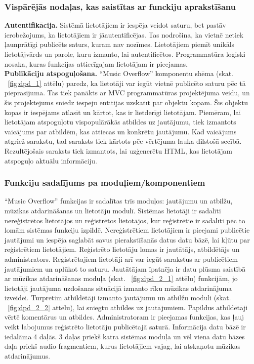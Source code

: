 \documentclass[12pt]{article}
\begin{document}
\subsubsection{Vispārējās nodaļas, kas saistītas ar funckiju aprakstīšanu}

\textbf{Autentifikācija.} Sistēmā lietotājiem ir iespēja veidot saturu, bet pastāv ierobežojums, ka lietotājiem ir jāautentificējas. Tas nodrošina, ka vietnē netiek ļaunprātīgi publicēts saturs, kuram nav nozīmes. Lietotājiem piemīt unikāls lietotājvārds un parole, kuru izmanto, lai autentificētos. Programmatūra loģiski nosaka, kuras funkcijas attiecīgajam lietotājam ir pieejamas.\\
\indent \textbf{Publikāciju atspoguļošana.} ``Music Overflow'' komponentu shēma (skat. ~\ref{fig:dpd_1} attēlu) paredz, ka lietotāji var iegūt vietnē publicēto saturu pēc tā pieprasījuma. Tas tiek panākts ar MVC programmatūras projektējuma veidu, un šis projektējums sniedz iespēju entītijas uzskatīt par objektu kopām. Šīs objektu kopas ir iespējams atlasīt un kārtot, kas ir lietderīgi lietotājam. Piemēram, lai lietotājam atspoguļotu vispopulārākās atbildes uz jautājumu, tiek izmantots vaicājums par atbildēm, kas attiecas un konkrētu jautājumu. Kad vaicājums atgriež sarakstu, tad saraksts tiek kārtots pēc vērtējuma lauka dilstošā secībā. Rezultējošais saraksts tiek izmantots, lai uzģenerētu HTML, kas lietotājam atspoguļo aktuālu informāciju. 

\subsubsection{Funkciju sadalījums pa moduļiem/komponentiem}

``Music Overflow'' funkcijas ir sadalītas trīs moduļos: jautājumu un atbilžu, mūzikas atdarināšanas un lietotāju modulī. Sistēmas lietotāji ir sadalīti nereģistrētos lietotājos un reģistrētos lietotājos, kur reģistrētie ir sadalīti pēc to lomām sistēmas funkciju izpildē. Nereģistrētiem lietotājiem ir pieejami publicētie jautājumi un iespēja saglabāt savus pierakstīšanās datus datu bāzē, lai kļūtu par reģistrētiem lietotājiem. Reģistrēto lietotāju lomas ir jautātājs, atbildētājs un administrators. Reģistrētajiem lietotāji arī var iegūt sarakstus ar publicētiem jautājumiem un aplūkot to saturu. Jautātājam īpatnēja ir datu plūsma saistībā ar mūzikas atdarināšanas moduļa (skat. ~\ref{fig:dpd_2_1} attēlu) funkcijām, jo lietotāji jautājuma uzdošanas situācijā izmanto rīku mūzikas atdarinājuma izveidei. Turpretim atbildētāji izmanto jautājumu un atbilžu moduli (skat. ~\ref{fig:dpd_2_2} attēlu), lai sniegtu atbildes uz jautājumiem. Papildus atbildētāji vērtē komentārus un atbildes. Administratoram ir pieejamas funkcijas, kas ļauj veikt labojumus reģistrēto lietotāju publicētajā saturā. Informācija datu bāzē ir iedalāma 4 daļās. 3 daļas priekš katra sistēmas moduļa un vēl viena datu bāzes daļa priekš audio fragmentiem, kurus lietotājiem vajag, lai atskaņotu mūzikas atdarinājumus.
\end{document}
